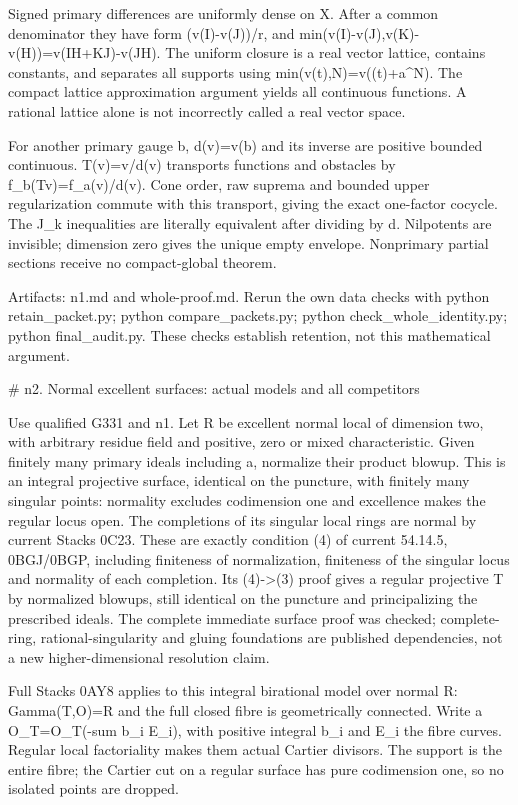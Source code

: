 \documentclass[11pt]{article}
\begin{document}
Signed primary differences are uniformly dense on X. After a common denominator they have form (v(I)-v(J))/r, and min(v(I)-v(J),v(K)-v(H))=v(IH+KJ)-v(JH). The uniform closure is a real vector lattice, contains constants, and separates all supports using min(v(t),N)=v((t)+a\textasciicircum{}N). The compact lattice approximation argument yields all continuous functions. A rational lattice alone is not incorrectly called a real vector space.

For another primary gauge b, d(v)=v(b) and its inverse are positive bounded continuous. T(v)=v/d(v) transports functions and obstacles by f\_b(Tv)=f\_a(v)/d(v). Cone order, raw suprema and bounded upper regularization commute with this transport, giving the exact one-factor cocycle. The J\_k inequalities are literally equivalent after dividing by d. Nilpotents are invisible; dimension zero gives the unique empty envelope. Nonprimary partial sections receive no compact-global theorem.

Artifacts: n1.md and whole-proof.md. Rerun the own data checks with python retain\_packet.py; python compare\_packets.py; python check\_whole\_identity.py; python final\_audit.py. These checks establish retention, not this mathematical argument.

 \# n2. Normal excellent surfaces: actual models and all competitors

Use qualified G331 and n1. Let R be excellent normal local of dimension two, with arbitrary residue field and positive, zero or mixed characteristic. Given finitely many primary ideals including a, normalize their product blowup. This is an integral projective surface, identical on the puncture, with finitely many singular points: normality excludes codimension one and excellence makes the regular locus open. The completions of its singular local rings are normal by current Stacks 0C23. These are exactly condition (4) of current 54.14.5, 0BGJ/0BGP, including finiteness of normalization, finiteness of the singular locus and normality of each completion. Its (4)->(3) proof gives a regular projective T by normalized blowups, still identical on the puncture and principalizing the prescribed ideals. The complete immediate surface proof was checked; complete-ring, rational-singularity and gluing foundations are published dependencies, not a new higher-dimensional resolution claim.

Full Stacks 0AY8 applies to this integral birational model over normal R: Gamma(T,O)=R and the full closed fibre is geometrically connected. Write a O\_T=O\_T(-sum b\_i E\_i), with positive integral b\_i and E\_i the fibre curves. Regular local factoriality makes them actual Cartier divisors. The support is the entire fibre; the Cartier cut on a regular surface has pure codimension one, so no isolated points are dropped.
\end{document}
